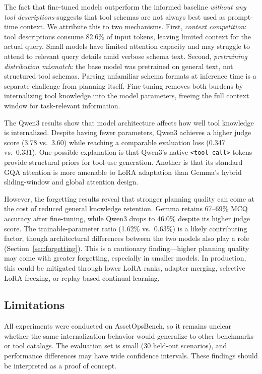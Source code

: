 \documentclass[conference]{IEEEtran}
\begin{document}
The fact that fine-tuned models outperform the informed baseline \emph{without any tool descriptions} suggests that tool schemas are not always best used as prompt-time context. We attribute this to two mechanisms. First, \emph{context competition}: tool descriptions consume 82.6\% of input tokens, leaving limited context for the actual query. Small models have limited attention capacity and may struggle to attend to relevant query details amid verbose schema text. Second, \emph{pretraining distribution mismatch}: the base model was pretrained on general text, not structured tool schemas. Parsing unfamiliar schema formats at inference time is a separate challenge from planning itself. Fine-tuning removes both burdens by internalizing tool knowledge into the model parameters, freeing the full context window for task-relevant information.

The Qwen3 results show that model architecture affects how well tool knowledge is internalized. Despite having fewer parameters, Qwen3 achieves a higher judge score (3.78 vs.\ 3.60) while reaching a comparable evaluation loss (0.347 vs.\ 0.331). One possible explanation is that Qwen3's native \texttt{<tool\_call>} tokens provide structural priors for tool-use generation. Another is that its standard GQA attention is more amenable to LoRA adaptation than Gemma's hybrid sliding-window and global attention design.

However, the forgetting results reveal that stronger planning quality can come at the cost of reduced general knowledge retention. Gemma retains 67--69\% MCQ accuracy after fine-tuning, while Qwen3 drops to 46.0\% despite its higher judge score. The trainable-parameter ratio (1.62\% vs.\ 0.63\%) is a likely contributing factor, though architectural differences between the two models also play a role (Section~\ref{sec:forgetting}). This is a cautionary finding---higher planning quality may come with greater forgetting, especially in smaller models. In production, this could be mitigated through lower LoRA ranks, adapter merging, selective LoRA freezing, or replay-based continual learning.


\subsection{Limitations}

All experiments were conducted on AssetOpsBench, so it remains unclear whether the same internalization behavior would generalize to other benchmarks or tool catalogs. The evaluation set is small (30 held-out scenarios), and performance differences may have wide confidence intervals. These findings should be interpreted as a proof of concept.
\end{document}
